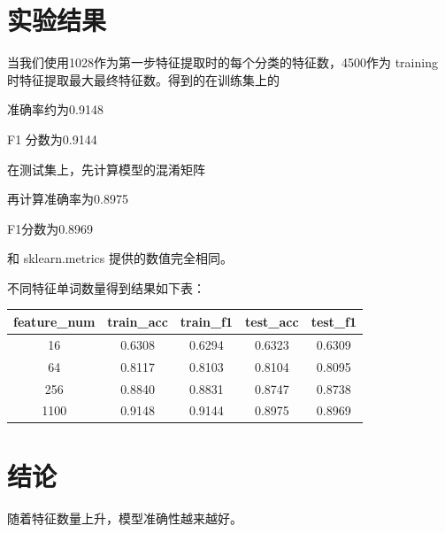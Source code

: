 \documentclass[12pt,letterpaper]{article}
\begin{document}
\section{实验结果}

当我们使用1028作为第一步特征提取时的每个分类的特征数，4500作为 training 时特征提取最大最终特征数。得到的在训练集上的

准确率约为0.9148

F1 分数为0.9144

在测试集上，先计算模型的混淆矩阵

再计算准确率为0.8975

F1分数为0.8969

和 sklearn.metrics 提供的数值完全相同。

不同特征单词数量得到结果如下表：

\begin{tabular}{|c|c|c|c|c|}
  \hline
  feature\_num & train\_acc & train\_f1 & test\_acc & test\_f1 \\
  \hline
  16 & 0.6308 & 0.6294 & 0.6323 & 0.6309 \\
  64 & 0.8117 & 0.8103 & 0.8104 & 0.8095 \\
  256 & 0.8840 & 0.8831 & 0.8747 & 0.8738 \\
  1100 & 0.9148 & 0.9144 & 0.8975 & 0.8969 \\
  \hline
\end{tabular}

\section{结论}

随着特征数量上升，模型准确性越来越好。
\end{document}
